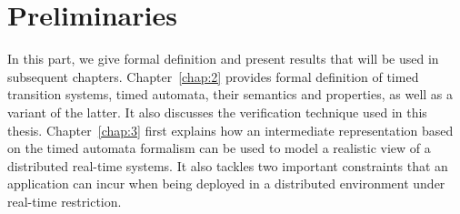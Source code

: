 \documentclass[a4paper,12pt,Times,twoside,numbered,index]{Classes/PhDThesisPSnPDF}
\begin{document}
\frontmatter




\begin{titlepage}
  \maketitle
\end{titlepage}


%
%




\dominitoc
\dominilof
\dominilot
\renewcommand{\baselinestretch}{0.9}\normalsize
\tableofcontents
\renewcommand{\baselinestretch}{1.0}\normalsize



\adjustmtc

\printnomencl

\mainmatter

\part{Preliminaries}
{In this part, we give formal definition and present results that will be used in subsequent
chapters. Chapter~\ref{chap:2} provides formal definition of timed transition systems,
timed automata, their semantics and properties, as well as a variant of the latter.
It also discusses the verification technique used in this thesis. Chapter~\ref{chap:3}
first explains how an intermediate representation based on the timed automata formalism
can be used to model a realistic view of a distributed real-time systems. It also tackles
two important constraints that an application can incur when being deployed in a distributed
environment under real-time restriction.} 


\end{document}
